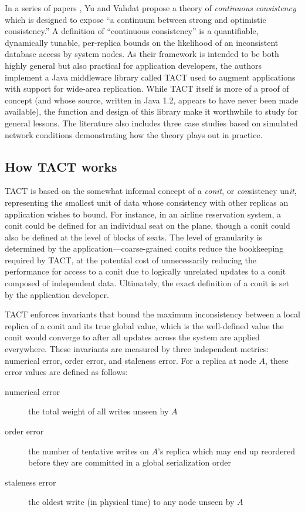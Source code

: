 In a series of papers \cite{2000tact} \cite{2000tactalgorithms} \cite{2002tact},
Yu and Vahdat propose a theory of \emph{continuous consistency} which is
designed to expose ``a continuum between strong and optimistic consistency.''  A
definition of  ``continuous consistency'' is a quantifiable, dynamically
tunable, per-replica bounds on the likelihood of an inconsistent database access
by system nodes. As their framework is intended to be both highly general but
also practical for application developers, the authors implement a Java
middleware library called TACT used to augment applications with support for
wide-area replication. While TACT itself is more of a proof of concept (and
whose source, written in Java 1.2, appears to have never been made available),
the function and design of this library make it worthwhile to study for general
lessons. The literature also includes three case studies based on simulated
network conditions demonstrating how the theory plays out in practice.
\cite{2002tact}

\subsection{How TACT works}

TACT is based on the somewhat informal concept of a \emph{conit}, or
\emph{con}sistency un\emph{it}, representing the smallest unit of data whose
consistency with other replicas an application wishes to bound. For instance, in
an airline reservation system, a conit could be defined for an individual seat
on the plane, though a conit could also be defined at the level of blocks of
seats. The level of granularity is determined by the
application---coarse-grained conits reduce the bookkeeping required by TACT, at
the potential cost of unnecessarily reducing the performance for access to a
conit due to logically unrelated updates to a conit composed of independent
data.  Ultimately, the exact definition of a conit is set by the application
developer.

TACT enforces invariants that bound the maximum inconsistency between a local
replica of a conit and its true global value, which is the well-defined value
the conit would converge to after all updates across the system are applied
everywhere. These invariants are measured by three independent metrics:
numerical error, order error, and staleness error. For a replica at node $A$,
these error values are defined as follows:

\begin{description}
   \item[numerical error] the total weight of all writes unseen by $A$
   \item[order error] the number of tentative writes on $A$'s replica which may
     end up reordered before they are committed in a global serialization order
   \item[staleness error] the oldest write (in physical time) to any node unseen
     by $A$
\end{description}

